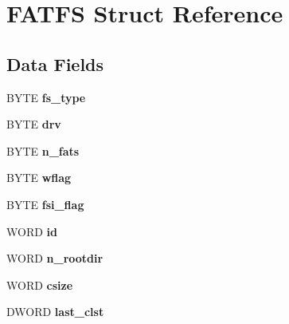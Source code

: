 \hypertarget{struct_f_a_t_f_s}{}\section{F\+A\+T\+FS Struct Reference}
\label{struct_f_a_t_f_s}
\subsection*{Data Fields}
\begin{DoxyCompactItemize}
\item 
B\+Y\+TE {\bfseries fs\+\_\+type}\hypertarget{struct_f_a_t_f_s_add27d97babe807b573eac98a71dc4ae5}{}\label{struct_f_a_t_f_s_add27d97babe807b573eac98a71dc4ae5}

\item 
B\+Y\+TE {\bfseries drv}\hypertarget{struct_f_a_t_f_s_a6a791560e2687e8b1569bfce61208d2d}{}\label{struct_f_a_t_f_s_a6a791560e2687e8b1569bfce61208d2d}

\item 
B\+Y\+TE {\bfseries n\+\_\+fats}\hypertarget{struct_f_a_t_f_s_a56716c7e7ac10cf46e73ffb2a2e9b545}{}\label{struct_f_a_t_f_s_a56716c7e7ac10cf46e73ffb2a2e9b545}

\item 
B\+Y\+TE {\bfseries wflag}\hypertarget{struct_f_a_t_f_s_a647e43c9ccae94b7274793d1909897de}{}\label{struct_f_a_t_f_s_a647e43c9ccae94b7274793d1909897de}

\item 
B\+Y\+TE {\bfseries fsi\+\_\+flag}\hypertarget{struct_f_a_t_f_s_a84e9cdc5a6a8e33ea7ec192058abf161}{}\label{struct_f_a_t_f_s_a84e9cdc5a6a8e33ea7ec192058abf161}

\item 
W\+O\+RD {\bfseries id}\hypertarget{struct_f_a_t_f_s_a417095d7c20d56d417dc0998e0dd5a5c}{}\label{struct_f_a_t_f_s_a417095d7c20d56d417dc0998e0dd5a5c}

\item 
W\+O\+RD {\bfseries n\+\_\+rootdir}\hypertarget{struct_f_a_t_f_s_a189a00aa038044ffad0fc7f7dcf2aae1}{}\label{struct_f_a_t_f_s_a189a00aa038044ffad0fc7f7dcf2aae1}

\item 
W\+O\+RD {\bfseries csize}\hypertarget{struct_f_a_t_f_s_ad7fa7a509f8d097a9ab182d6c47be568}{}\label{struct_f_a_t_f_s_ad7fa7a509f8d097a9ab182d6c47be568}

\item 
D\+W\+O\+RD {\bfseries last\+\_\+clst}\hypertarget{struct_f_a_t_f_s_ac26e848817569fedc15a9a4e49ddedd1}{}\label{struct_f_a_t_f_s_ac26e848817569fedc15a9a4e49ddedd1}


\end{DoxyCompactItemize}
